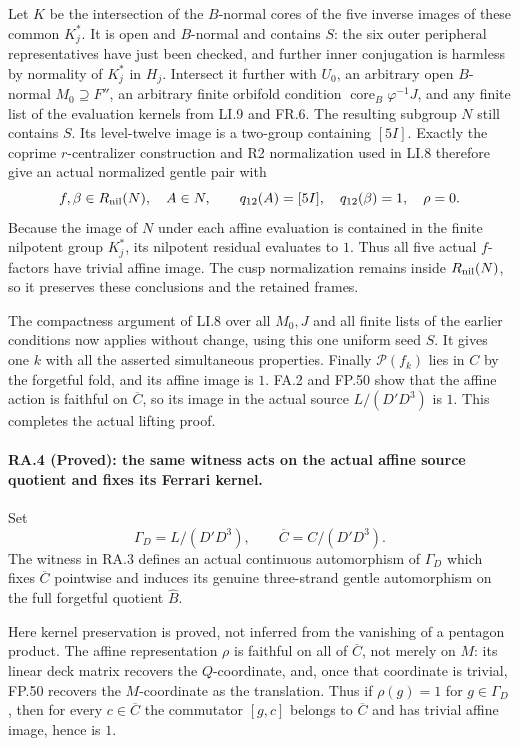 Let $K$ be the intersection of the $B$-normal cores of
the five inverse images of these common $K_j^*$.
It is open and $B$-normal and contains $S$: the six
outer peripheral representatives have just been checked,
and further inner conjugation is harmless by normality
of $K_j^*$ in $H_j$.  Intersect it further with
$U_0$, an arbitrary open $B$-normal $M_0\supseteq F''$,
an arbitrary finite orbifold condition
$\operatorname{core}_B\varphi^{-1}J$, and any finite list
of the evaluation kernels from LI.9 and FR.6.  The
resulting subgroup $N$ still contains $S$.  Its
level-twelve image is a two-group containing $[5I]$.
Exactly the coprime $r$-centralizer construction and R2
normalization used in LI.8 therefore give an actual
normalized gentle pair with
\[
 f,\beta\in R_{\rm nil}(N),\quad A\in N,
 \qquad q_{12}(A)=[5I],\quad q_{12}(\beta)=1,
 \quad\rho=0.
\]
Because the image of $N$ under each affine evaluation
is contained in the finite nilpotent group $K_j^*$, its
nilpotent residual evaluates to $1$.  Thus all five
actual $f$-factors have trivial affine image.  The cusp
normalization remains inside $R_{\rm nil}(N)$, so it
preserves these conclusions and the retained frames.

The compactness argument of LI.8 over all $M_0,J$ and
all finite lists of the earlier conditions now applies
without change, using this one uniform seed $S$.
It gives one $k$ with all the asserted simultaneous
properties.  Finally $\mathcal P(f_k)$ lies in $C$ by
the forgetful fold, and its affine image is $1$.
FA.2 and FP.50 show that the affine action is faithful on
$\overline C$, so its image in the actual source
$L/(D'D^3)$ is $1$.
This completes the actual lifting proof.

\paragraph{RA.4 (Proved): the same witness acts on the actual
affine source quotient and fixes its Ferrari kernel.}
Set
\[
 \Gamma_D=L/(D'D^3),
 \qquad \overline C=C/(D'D^3).
\]
The witness in RA.3 defines an actual continuous automorphism
of $\Gamma_D$ which fixes $\overline C$ pointwise and induces
its genuine three-strand gentle automorphism on the full
forgetful quotient $\widehat B$.

Here kernel preservation is proved, not inferred from the
vanishing of a pentagon product.  The affine representation
$\rho$ is faithful on all of $\overline C$, not merely on
$M$: its linear deck matrix recovers the $Q$-coordinate,
and, once that coordinate is trivial, FP.50 recovers the
$M$-coordinate as the translation.  Thus if $\rho(g)=1$
for $g\in\Gamma_D$, then for every $c\in\overline C$
the commutator $[g,c]$ belongs to $\overline C$ and has
trivial affine image, hence is $1$.

